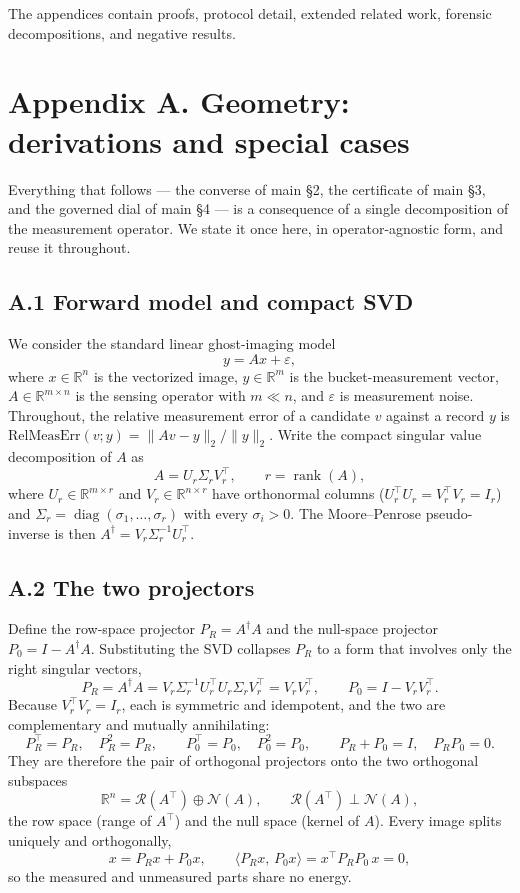 \documentclass[11pt]{article}
\begin{document}
The appendices contain proofs, protocol detail, extended related work, forensic decompositions, and negative results.

\section*{Appendix A. Geometry: derivations and special cases}

Everything that follows --- the converse of main §2, the certificate of main §3, and the governed dial of main §4 --- is a consequence of a single decomposition of the measurement operator. We state it once here, in operator-agnostic form, and reuse it throughout.

\subsection*{A.1 Forward model and compact SVD}

We consider the standard linear ghost-imaging model
$$y = A x + \varepsilon,$$
where $x \in \mathbb{R}^n$ is the vectorized image, $y \in \mathbb{R}^m$ is the bucket-measurement vector, $A \in \mathbb{R}^{m \times n}$ is the sensing operator with $m \ll n$, and $\varepsilon$ is measurement noise. Throughout, the relative measurement error of a candidate $v$ against a record $y$ is $\mathrm{RelMeasErr}(v; y) = \lVert A v - y \rVert_2 / \lVert y \rVert_2$. Write the compact singular value decomposition of $A$ as
$$A = U_r \Sigma_r V_r^\top, \qquad r = \operatorname{rank}(A),$$
where $U_r \in \mathbb{R}^{m \times r}$ and $V_r \in \mathbb{R}^{n \times r}$ have orthonormal columns ($U_r^\top U_r = V_r^\top V_r = I_r$) and $\Sigma_r = \operatorname{diag}(\sigma_1, \dots, \sigma_r)$ with every $\sigma_i > 0$. The Moore--Penrose pseudo-inverse is then $A^\dagger = V_r \Sigma_r^{-1} U_r^\top$.

\subsection*{A.2 The two projectors}

Define the row-space projector $P_R = A^\dagger A$ and the null-space projector $P_0 = I - A^\dagger A$. Substituting the SVD collapses $P_R$ to a form that involves only the right singular vectors,
$$P_R = A^\dagger A = V_r \Sigma_r^{-1} U_r^\top U_r \Sigma_r V_r^\top = V_r V_r^\top, \qquad P_0 = I - V_r V_r^\top.$$
Because $V_r^\top V_r = I_r$, each is symmetric and idempotent, and the two are complementary and mutually annihilating:
$$P_R^\top = P_R, \quad P_R^2 = P_R, \qquad P_0^\top = P_0, \quad P_0^2 = P_0, \qquad P_R + P_0 = I, \quad P_R P_0 = 0 .$$
They are therefore the pair of orthogonal projectors onto the two orthogonal subspaces
$$\mathbb{R}^n = \mathcal{R}(A^\top) \oplus \mathcal{N}(A), \qquad \mathcal{R}(A^\top) \perp \mathcal{N}(A),$$
the row space (range of $A^\top$) and the null space (kernel of $A$). Every image splits uniquely and orthogonally,
$$x = P_R x + P_0 x, \qquad \langle P_R x, \, P_0 x \rangle = x^\top P_R P_0\, x = 0,$$
so the measured and unmeasured parts share no energy.
\end{document}
